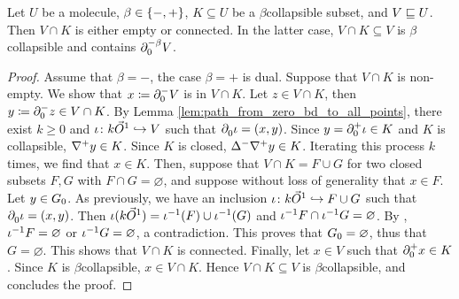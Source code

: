 \begin{lem} \label{lem:collapsible_connected_with_all_closure_element}
    Let \( U \) be a molecule, \( \beta \in \set{-, +} \), \( K \subseteq U \) be a \( \beta \)\nbd collapsible subset, and \( V \submol U \).
    Then \( V \cap K \) is either empty or connected.
    In the latter case, \( V \cap K \subseteq V \) is \( \beta \)\nbd collapsible and contains \( \bd{0}{-\beta} V \).
\end{lem}
\begin{proof}
    Assume that \( \beta = - \), the case \( \beta = + \) is dual.
    Suppose that \( V \cap K \) is non-empty.
    We show that \( x \eqdef \bd{0}{-} V \) is in \( V \cap K \).
    Let \( z \in V \cap K \), then \( y \eqdef \bd{0}{-} z \in V \cap K \).
    By Lemma \ref{lem:path_from_zero_bd_to_all_points}, there exist \( k \geq 0 \) and \( \iota \colon k\arr \incl V \) such that \( \bd{0}{} \iota = (x, y) \).
    Since \( y = \bd{0}{+} \iota \in K \) and \( K \) is collapsible, \( \cofaces{}{+} y \in K \).
    Since \( K \) is closed, \( \faces{}{-} \cofaces{}{+} y \in K \).
    Iterating this process \( k \)\nbd times, we find that \( x \in K \).
    Then, suppose that \( V \cap K = F \cup G \) for two closed subsets \( F, G \) with \( F \cap G = \varnothing \), and suppose without loss of generality that \( x \in F \).
    Let \( y \in \gr{0}{G} \). 
    As previously, we have an inclusion \( \iota \colon k\arr \incl F \cup G \) such that \( \bd{0}{}\iota = (x, y) \).
    Then \( \iota(k\arr) = \invrs{\iota}(F) \cup \invrs{\iota}(G) \) and \( \invrs{\iota}F \cap \invrs{\iota}G = \varnothing \).
    By \cite[Lemma 3.3.13]{hadzihasanovic2024combinatorics}, \( \invrs{\iota}F = \varnothing \) or \( \invrs{\iota}G = \varnothing \), a contradiction.
    This proves that \(  \gr{0}{G} = \varnothing \), thus that \( G = \varnothing \).
    This shows that \( V \cap K \) is connected.
    Finally, let \( x \in V \) such that \( \bd{0}{+} x \in K \).
    Since \( K \) is  \( \beta \)\nbd collapsible, \( x \in V \cap K \).
    Hence \( V \cap K \subseteq V \) is \( \beta \)\nbd collapsible, and concludes the proof.
\end{proof}

